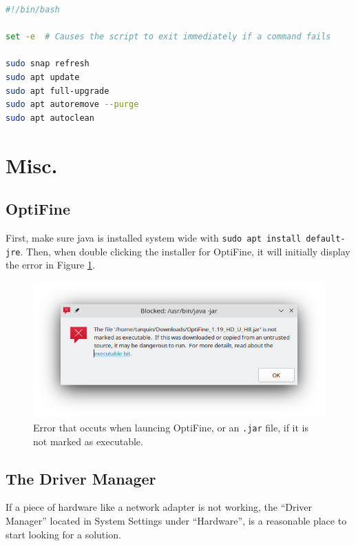 \documentclass[a4paper, 12pt]{article}
\begin{document}
\begin{lstlisting}[language=Bash]
#!/bin/bash

set -e  # Causes the script to exit immediately if a command fails

sudo snap refresh
sudo apt update
sudo apt full-upgrade
sudo apt autoremove --purge
sudo apt autoclean

\end{lstlisting}

\section{Misc.}

\subsection{OptiFine}

First, make sure java is installed system wide with \texttt{sudo apt install default-jre}. Then, when double clicking the installer for OptiFine, it will initially display the error in Figure \ref{fig:optifine}.

\begin{figure}[h]
 \centering
 \includegraphics[width=0.6\linewidth]{images/optifine}
 \caption{Error that occuts when launcing OptiFine, or an \texttt{.jar} file, if it is not marked as executable.}
 \label{fig:optifine}
\end{figure}

\subsection{The Driver Manager}

If a piece of hardware like a network adapter is not working, the ``Driver Manager'' located in System Settings under ``Hardware'', is a reasonable place to start looking for a solution.
\end{document}
